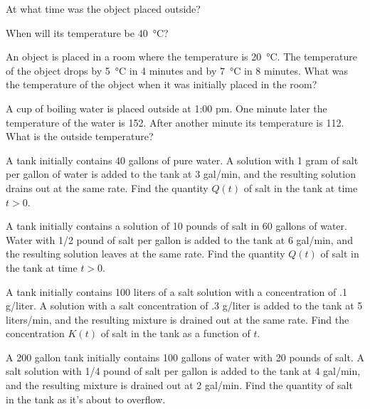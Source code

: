 \begin{exerciselist}
\begin{alist}
\item %
At what time was the object placed outside?

\item %
When will its temperature be \qty{40}{\degreeCelsius}?
\end{alist}

\item\label{exer:4.2.6}An object is placed in a room where the temperature is
\qty{20}{\degreeCelsius}.  The temperature of the object drops by
\qty{5}{\degreeCelsius} in 4 minutes and by \qty{7}{\degreeCelsius} in 8 minutes.
What was the temperature of the object when it was initially
placed in the room?

\item\label{exer:4.2.7}A cup of boiling water is placed outside at 1:00 {\sc pm}.  One
minute later the temperature of the water is \qty{152}{\degreeFahrenheit}.
After another minute its temperature is \qty{112}{\degreeFahrenheit}.  What
is the outside temperature?

\item\label{exer:4.2.8}A tank initially contains 40 gallons of pure water.  A
solution with 1 gram of salt per gallon of water is added
to the tank at 3 gal/min, and the  resulting
solution drains out at the same rate.  Find the quantity $Q(t)$
of salt in the tank at time $t > 0$.

\item\label{exer:4.2.9}A tank initially contains a solution of 10 pounds of salt in
60 gallons of water.  Water with 1/2 pound of salt per
gallon is added to the tank at 6 gal/min, and the
 resulting solution leaves at the same rate.
Find the quantity $Q(t)$ of salt in the tank at time
$t > 0$.

\item\label{exer:4.2.10}A  tank initially contains 100 liters of a salt solution
with a concentration of .1 g/liter.  A solution with a
salt concentration of .3 g/liter is added to the tank at
5 liters/min, and the resulting mixture is
drained out at the same rate.  Find the concentration $K(t)$
of salt in the tank as a function of $t$.

\item\label{exer:4.2.11}A 200 gallon tank initially contains 100 gallons of water
with 20 pounds of salt.  A salt solution with 1/4 pound of
salt per gallon is added to the tank at 4 gal/min, and the
resulting  mixture is drained out at 2 gal/min.
Find the quantity of salt in the tank as it's about to
overflow.


\end{exerciselist}
